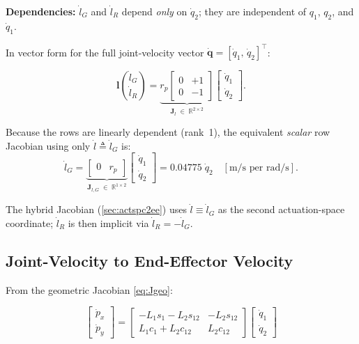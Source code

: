 \documentclass[12pt, a4paper]{article}
\theoremstyle{definition}
\newcommand{\bq}{\bm{q}}
\newcommand{\bl}{\bm{l}}
\begin{document}
\noindent
\textbf{Dependencies:} $\dot{l}_G$ and $\dot{l}_R$ depend \emph{only} on
$\dot{q}_2$; they are independent of $q_1$, $q_2$, and $\dot{q}_1$.

In vector form for the full joint-velocity vector
$\dot{\bq} = [\dot{q}_1,\,\dot{q}_2]^\top$:

\begin{equation}
  \label{eq:ldot_row}
  \bl{\dot{l}_G \choose \dot{l}_R}
  =
  \underbrace{r_p\begin{bmatrix} 0 & +1 \\ 0 & -1 \end{bmatrix}}_{\bm{J}_l \;\in\;\mathbb{R}^{2\times 2}}
  \begin{bmatrix} \dot{q}_1 \\ \dot{q}_2 \end{bmatrix}.
\end{equation}

Because the rows are linearly dependent (rank~1), the equivalent
\emph{scalar} row Jacobian using only $\dot{l} \triangleq \dot{l}_G$ is:
\begin{equation}
  \label{eq:ldot_scalar}
  \dot{l}_G
  = \underbrace{\begin{bmatrix} 0 & r_p \end{bmatrix}}_{\bm{J}_{l,G} \;\in\;\mathbb{R}^{1\times 2}}
  \begin{bmatrix} \dot{q}_1 \\ \dot{q}_2 \end{bmatrix}
  = 0.04775\;\dot{q}_2 \quad [\text{m/s per rad/s}].
\end{equation}

\noindent
The hybrid Jacobian (\cref{sec:actspc2ee}) uses $\dot{l} \equiv \dot{l}_G$ as
the second actuation-space coordinate; $\dot{l}_R$ is then implicit via
$\dot{l}_R = -\dot{l}_G$.

\subsection{Joint-Velocity to End-Effector Velocity}
\label{sec:qdot2ee}

From the geometric Jacobian \cref{eq:Jgeo}:

\begin{equation}
  \label{eq:ee_vel}
  \boxed{
  \begin{bmatrix} \dot{p}_x \\ \dot{p}_y \end{bmatrix}
  =
  \begin{bmatrix}
    -L_1 s_1 - L_2 s_{12} & -L_2 s_{12} \\[4pt]
     L_1 c_1 + L_2 c_{12} &  L_2 c_{12}
  \end{bmatrix}
  \begin{bmatrix} \dot{q}_1 \\ \dot{q}_2 \end{bmatrix}
  }
\end{equation}
\end{document}
